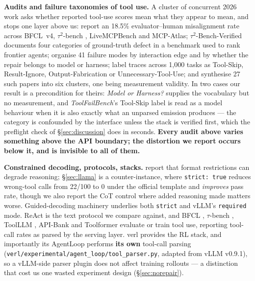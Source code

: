 \textbf{Audits and failure taxonomies of tool use.} A cluster of concurrent 2026 work asks whether
reported tool-use scores mean what they appear to mean, and stops one layer above us:
\citet{bhat2026benchmarkingbenchmarks} report an 18.5\% evaluator--human misalignment rate across
BFCL~v4, $\tau^2$-bench \citep{barres2025tau2bench}, LiveMCPBench and MCP-Atlas;
$\tau^2$-Bench-Verified \citep{tau2benchverified} documents four categories of ground-truth defect
in a benchmark used to rank frontier agents; \citet{raj2026modelorharness} organise 41 failure
modes by interaction edge and by whether the repair belongs to model or harness;
\citet{soni2026toolfailbench} label traces across 1{,}000 tasks as Tool-Skip, Result-Ignore,
Output-Fabrication or Unnecessary-Tool-Use; and \citet{albayaydh2026beyondleaderboard} synthesise
27 such papers into six clusters, one being measurement validity. In two cases our result is a
precondition for theirs: \emph{Model or Harness?} supplies the vocabulary but no measurement, and
\emph{ToolFailBench}'s Tool-Skip label is read as a model behaviour when it is also exactly what an
unparsed emission produces --- the category is confounded by the interface unless the stack is
verified first, which the preflight check of \S\ref{sec:discussion} does in seconds.
\textbf{Every audit above varies something above the API boundary; the distortion we report occurs
below it, and is invisible to all of them.}

\textbf{Constrained decoding, protocols, stacks.} \citet{tam2024speakfreely} report that format
restrictions can degrade reasoning; \S\ref{sec:llama} is a counter-instance, where
\texttt{strict: true} reduces wrong-tool calls from 22/100 to 0 under the official template and
\emph{improves} pass rate, though
we also report the CoT control where added reasoning made matters worse. Guided-decoding machinery
\citep{willard2023outlines} underlies both \texttt{strict} and vLLM's \texttt{required} mode.
ReAct \citep{yao2023react} is the text protocol we compare against, and BFCL
\citep{bfcl2025}, $\tau$-bench \citep{yao2025taubench}, ToolLLM \citep{qin2024toolllm}, API-Bank
\citep{li2023apibank} and Toolformer \citep{schick2023toolformer} evaluate or train tool use,
reporting tool-call rates as parsed by the serving layer. verl \citep{sheng2025hybridflow}
provides the RL stack, and importantly its AgentLoop performs \textbf{its own} tool-call parsing
(\texttt{verl/experimental/agent\_loop/tool\_parser.py}, adapted from vLLM v0.9.1), so a vLLM-side
parser plugin does not affect training rollouts --- a distinction that cost us one wasted
experiment design (\S\ref{sec:norepair}).

